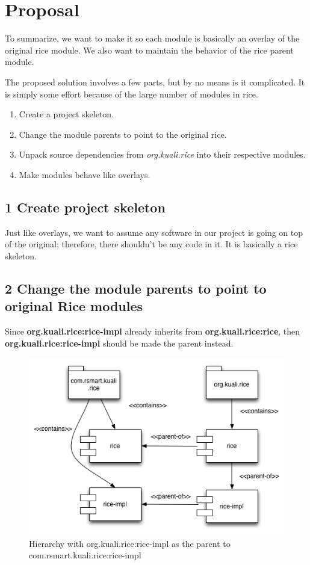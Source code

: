 \documentclass[12pt,notitlepage]{article}
\begin{document}
\section{Proposal}
To summarize, we want to make it so each module is basically an overlay of the original rice module. We also want to maintain the behavior of the rice parent module.

The proposed solution involves a few parts, but by no means is it complicated. It is simply some effort because of the large number of modules in rice.
\begin{enumerate}
\item Create a project skeleton.
\item Change the module parents to point to the original rice.
\item Unpack source dependencies from \emph{org.kuali.rice} into their respective modules.
\item Make modules behave like overlays.
\end{enumerate}

\subsection*{1 Create project skeleton}
Just like overlays, we want to assume any software in our project is going on top of the original; therefore, there shouldn't be any code in it. It is basically a rice skeleton.

\subsection*{2 Change the module parents to point to original Rice modules}

Since \textbf{org.kuali.rice:rice-impl} already inherits from \textbf{org.kuali.rice:rice}, then \textbf{org.kuali.rice:rice-impl} should be made the parent instead.

\begin{figure}[hbp]
  \includegraphics[width=\textwidth]{diagrams/RiceMaven2.png}
  \caption{Hierarchy with org.kuali.rice:rice-impl as the parent to com.rsmart.kuali.rice:rice-impl}
\end{figure}
\end{document}
